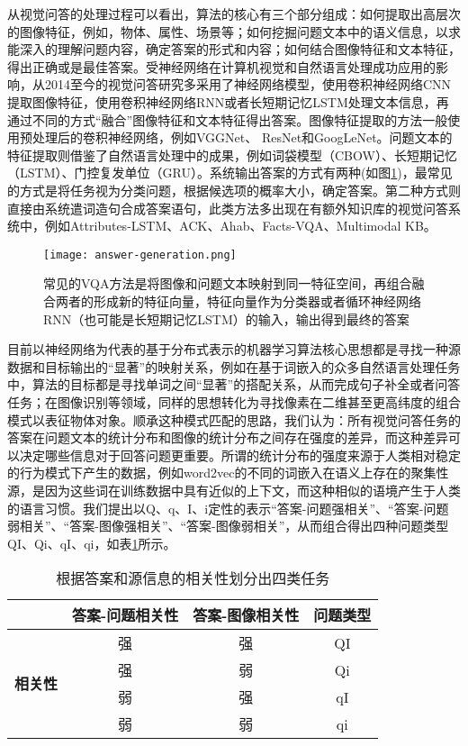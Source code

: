 从视觉问答的处理过程可以看出，算法的核心有三个部分组成：如何提取出高层次的图像特征，例如，物体、属性、场景等；如何挖掘问题文本中的语义信息，以求能深入的理解问题内容，确定答案的形式和内容；如何结合图像特征和文本特征，得出正确或是最佳答案。受神经网络在计算机视觉和自然语言处理成功应用的影响，从2014至今的视觉问答研究多采用了神经网络模型，使用卷积神经网络CNN提取图像特征，使用卷积神经网络RNN或者长短期记忆LSTM处理文本信息，再通过不同的方式“融合”图像特征和文本特征得出答案。图像特征提取的方法一般使用预处理后的卷积神经网络，例如VGGNet、 ResNet和GoogLeNet。问题文本的特征提取则借鉴了自然语言处理中的成果，例如词袋模型（CBOW）、长短期记忆（LSTM）、门控复发单位（GRU）。系统输出答案的方式有两种(如图\ref{answer-generation})，最常见的方式是将任务视为分类问题，根据候选项的概率大小，确定答案。第二种方式则直接由系统遣词造句合成答案语句，此类方法多出现在有额外知识库的视觉问答系统中，例如Attributes-LSTM、ACK、Ahab、Facts-VQA、Multimodal KB。
\begin{figure}[H]
	\centering
	\texttt{[image: answer-generation.png]}
	\caption{常见的VQA方法是将图像和问题文本映射到同一特征空间，再组合融合两者的形成新的特征向量，特征向量作为分类器或者循环神经网络RNN（也可能是长短期记忆LSTM）的输入，输出得到最终的答案}
	\label{answer-generation}
\end{figure}

目前以神经网络为代表的基于分布式表示的机器学习算法核心思想都是寻找一种源数据和目标输出的“显著”的映射关系，例如在基于词嵌入的众多自然语言处理任务中，算法的目标都是寻找单词之间“显著”的搭配关系，从而完成句子补全或者问答任务；在图像识别等领域，同样的思想转化为寻找像素在二维甚至更高纬度的组合模式以表征物体对象。顺承这种模式匹配的思路，我们认为：所有视觉问答任务的答案在问题文本的统计分布和图像的统计分布之间存在强度的差异，而这种差异可以决定哪些信息对于回答问题更重要。所谓的统计分布的强度来源于人类相对稳定的行为模式下产生的数据，例如word2vec的不同的词嵌入在语义上存在的聚集性源，是因为这些词在训练数据中具有近似的上下文，而这种相似的语境产生于人类的语言习惯。我们提出以Q、q、I、i定性的表示“答案-问题强相关”、“答案-问题弱相关”、“答案-图像强相关”、“答案-图像弱相关”，从而组合得出四种问题类型QI、Qi、qI、qi，如表\ref{ques_type}所示。
\begin{table}[H]
\centering
\caption{根据答案和源信息的相关性划分出四类任务}
\begin{tabular*}{0.9\textwidth}{@{\extracolsep{\fill}}lccc}
\toprule
& \textbf{答案-问题相关性} & \textbf{答案-图像相关性} & \textbf{问题类型} \\
\midrule
\multirow{4}{*}{\textbf{相关性}} &  强& 强&  QI\\
&  强& 弱&  Qi\\
&  弱& 强&  qI\\
&  弱& 弱&  qi\\
\bottomrule
\end{tabular*}
\label{ques_type}
\end{table}

